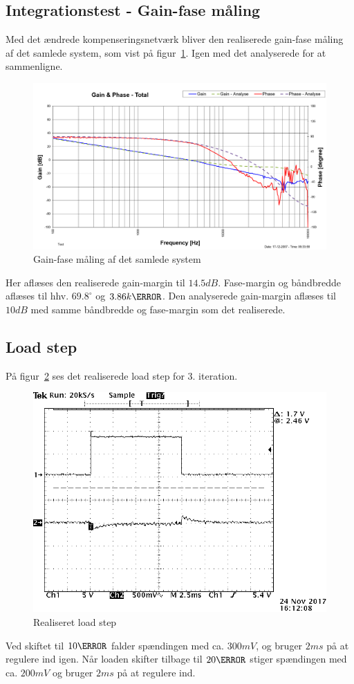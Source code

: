 \subsection{Integrationstest - Gain-fase måling}
Med det ændrede kompenseringsnetværk bliver den realiserede gain-fase måling af det samlede system, som vist på figur~\ref{fig:Realisering_total_3}. Igen med det analyserede for at sammenligne.
\begin{figure}[H]
	\center
	\includegraphics[max width=0.7\linewidth]{../dokumentation/tex/3iteration/billeder/Realisering/Realisering_gain_fase_total.PNG}
	\caption{Gain-fase måling af det samlede system}
	\label{fig:Realisering_total_3}
\end{figure}
Her aflæses den realiserede gain-margin til $14.5dB$. Fase-margin og båndbredde aflæses til hhv. $69.8^\circ$ og $3.86k\hertz$. Den analyserede gain-margin aflæses til $10dB$ med samme båndbredde og fase-margin som det realiserede.

\subsection{Load step}
På figur~\ref{fig:Loadstep3} ses det realiserede load step for 3. iteration.
\begin{figure}[H]
	\center
	\includegraphics[max width=0.7\linewidth]{../dokumentation/tex/3iteration/billeder/realisering/Loadstep.PNG}
	\caption{Realiseret load step}
	\label{fig:Loadstep3}
\end{figure} 
Ved skiftet til $10\ohm$ falder spændingen med ca. $300mV$, og bruger $2ms$ på at regulere ind igen. Når loaden skifter tilbage til $20\ohm$ stiger spændingen med ca. $200mV$ og bruger $2ms$ på at regulere ind. 